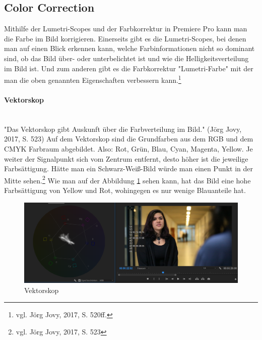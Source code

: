 \subsection{Color Correction}
Mithilfe der Lumetri-Scopes und der Farbkorrektur in Premiere Pro kann man die Farbe im Bild korrigieren. Einerseits gibt es die Lumetri-Scopes, bei denen man auf einen Blick erkennen kann, welche Farbinformationen nicht so dominant sind, ob das Bild über- oder unterbelichtet ist und wie die Helligkeitsverteilung im Bild ist. Und zum anderen gibt es die Farbkorrektur "Lumetri-Farbe" mit der man die oben genannten Eigenschaften verbessern kann.\footnote{vgl. Jörg Jovy, 2017, S. 520ff.}
\paragraph{Vektorskop}
\leavevmode \\
"Das Vektorskop gibt Auskunft über die Farbverteilung im Bild." (Jörg Jovy, 2017, S. 523) Auf dem Vektorskop sind die Grundfarben aus dem RGB und dem CMYK Farbraum abgebildet. Also: Rot, Grün, Blau, Cyan, Magenta, Yellow. Je weiter der Signalpunkt sich vom Zentrum entfernt, desto höher ist die jeweilige Farbsättigung. Hätte man ein Schwarz-Weiß-Bild würde man einen Punkt in der Mitte sehen.\footnote{vgl. Jörg Jovy, 2017, S. 523}\newline
Wie man auf der Abbildung \ref{fig:abb22} sehen kann, hat das Bild eine hohe Farbsättigung von Yellow und Rot, wohingegen es nur wenige Blauanteile hat.
\begin{figure}[H]
	\centering
	\includegraphics[width=1.0\textwidth]{abb22} 
	\caption{Vektorskop}\label{fig:abb22}
\end{figure}
